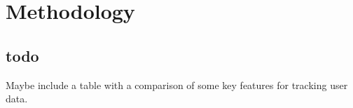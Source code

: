 \chapter{Methodology}
\label{ch:methodology}

%
%
\section{todo}
\label{sec:methodology:todo}

Maybe include a table with a comparison of some key features for tracking user data.